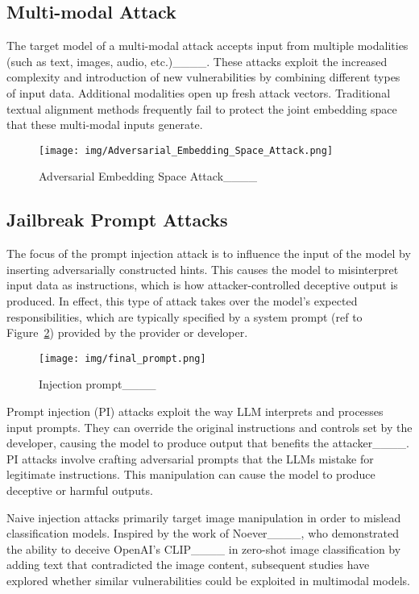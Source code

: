 \subsection{Multi-modal Attack}
The target model of a multi-modal attack accepts input from multiple modalities (such as text, images, audio, etc.)____. These attacks exploit the increased complexity and introduction of new vulnerabilities by combining different types of input data. Additional modalities open up fresh attack vectors. Traditional textual alignment methods frequently fail to protect the joint embedding space that these multi-modal inputs generate.
\begin{figure}[htbp]
    \centering
    \texttt{[image: img/Adversarial\_Embedding\_Space\_Attack.png]}
    \caption{Adversarial Embedding Space Attack____}
    \label{fig:embedding_space_attack}
\end{figure}

\subsection{Jailbreak Prompt Attacks}
The focus of the prompt injection attack is to influence the input of the model by inserting adversarially constructed hints.  This causes the model to misinterpret input data as instructions, which is how attacker-controlled deceptive output is produced.  In effect, this type of attack takes over the model's expected responsibilities, which are typically specified by a system prompt (ref to Figure~\ref{fig:injection_prompt}) provided by the provider or developer.  
\begin{figure}[htbp]
    \centering
    \texttt{[image: img/final\_prompt.png]}
    \caption{Injection prompt____}
    \label{fig:injection_prompt}
\end{figure}

 Prompt injection (PI) attacks exploit the way LLM interprets and processes input prompts. They can override the original instructions and controls set by the developer, causing the model to produce output that benefits the attacker____. PI attacks involve crafting adversarial prompts that the LLMs mistake for legitimate instructions. This manipulation can cause the model to produce deceptive or harmful outputs.



Naive injection attacks primarily target image manipulation in order to mislead classification models. Inspired by the work of Noever____, who demonstrated the ability to deceive OpenAI’s CLIP____ in zero-shot image classification by adding text that contradicted the image content, subsequent studies have explored whether similar vulnerabilities could be exploited in multimodal models. 

